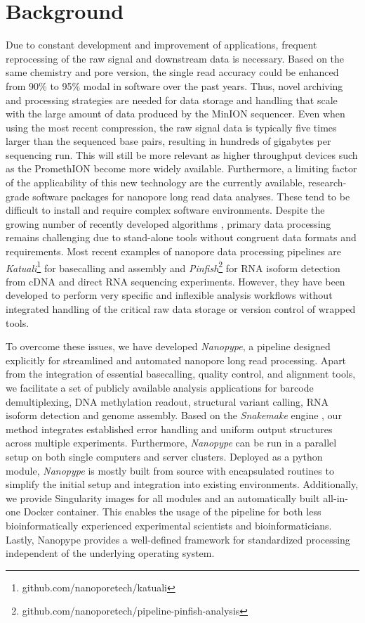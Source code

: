 \section{Background}
\label{sec:nanopype:background}

Due to constant development and improvement of applications, frequent reprocessing of the raw signal and downstream data is necessary. Based on the same chemistry and pore version, the single read accuracy could be enhanced from 90\% to 95\% modal in software over the past years. Thus, novel archiving and processing strategies are needed for data storage and handling that scale with the large amount of data produced by the MinION sequencer. Even when using the most recent compression, the raw signal data is typically five times larger than the sequenced base pairs, resulting in hundreds of gigabytes per sequencing run. This will still be more relevant as higher throughput devices such as the PromethION become more widely available. Furthermore, a limiting factor of the applicability of this new technology are the currently available, research-grade software packages for nanopore long read data analyses. These tend to be difficult to install and require complex software environments. Despite the growing number of recently developed algorithms \cite{Magi2018}, primary data processing remains challenging due to stand-alone tools without congruent data formats and requirements. 
Most recent examples of nanopore data processing pipelines are \textit{Katuali}\footnote{github.com/nanoporetech/katuali} for basecalling and assembly and \textit{Pinfish}\footnote{github.com/nanoporetech/pipeline-pinfish-analysis} for RNA isoform detection from cDNA and direct RNA sequencing experiments. However, they have been developed to perform very specific and inflexible analysis workflows without integrated handling of the critical raw data storage or version control of wrapped tools.

To overcome these issues, we have developed \textit{Nanopype}, a pipeline designed explicitly for streamlined and automated nanopore long read processing. Apart from the integration of essential basecalling, quality control, and alignment tools, we facilitate a set of publicly available analysis applications for barcode demultiplexing, DNA methylation readout, structural variant calling, RNA isoform detection and genome assembly. 
Based on the \textit{Snakemake} engine \cite{Koester2012}, our method integrates established error handling and uniform output structures across multiple experiments. Furthermore, \textit{Nanopype} can be run in a parallel setup on both single computers and server clusters. Deployed as a python module, \textit{Nanopype} is mostly built from source with encapsulated routines to simplify the initial setup and integration into existing environments. Additionally, we provide Singularity images for all modules and an automatically built all-in-one Docker container. This enables the usage of the pipeline for both less bioinformatically experienced experimental scientists and bioinformaticians. Lastly, Nanopype provides a well-defined framework for standardized processing independent of the underlying operating system.




